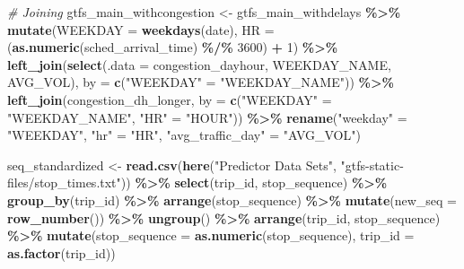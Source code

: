 \documentclass[
  12pt,
]{article}
\newenvironment{Shaded}{\begin{snugshade}}{\end{snugshade}}
\newcommand{\AttributeTok}[1]{\textcolor[rgb]{0.13,0.29,0.53}{#1}}
\newcommand{\CommentTok}[1]{\textcolor[rgb]{0.56,0.35,0.01}{\textit{#1}}}
\newcommand{\DecValTok}[1]{\textcolor[rgb]{0.00,0.00,0.81}{#1}}
\newcommand{\FunctionTok}[1]{\textcolor[rgb]{0.13,0.29,0.53}{\textbf{#1}}}
\newcommand{\NormalTok}[1]{#1}
\newcommand{\OtherTok}[1]{\textcolor[rgb]{0.56,0.35,0.01}{#1}}
\newcommand{\SpecialCharTok}[1]{\textcolor[rgb]{0.81,0.36,0.00}{\textbf{#1}}}
\newcommand{\StringTok}[1]{\textcolor[rgb]{0.31,0.60,0.02}{#1}}
\begin{document}
\begin{Shaded}
\begin{Highlighting}[]
\CommentTok{\# Joining}
\NormalTok{gtfs\_main\_withcongestion }\OtherTok{\textless{}{-}}\NormalTok{ gtfs\_main\_withdelays }\SpecialCharTok{\%\textgreater{}\%}
  \FunctionTok{mutate}\NormalTok{(}\AttributeTok{WEEKDAY =} \FunctionTok{weekdays}\NormalTok{(date),}
         \AttributeTok{HR =}\NormalTok{ (}\FunctionTok{as.numeric}\NormalTok{(sched\_arrival\_time) }\SpecialCharTok{\%/\%} \DecValTok{3600}\NormalTok{) }\SpecialCharTok{+} \DecValTok{1}\NormalTok{) }\SpecialCharTok{\%\textgreater{}\%}
  \FunctionTok{left\_join}\NormalTok{(}\FunctionTok{select}\NormalTok{(}\AttributeTok{.data =}\NormalTok{ congestion\_dayhour, WEEKDAY\_NAME, AVG\_VOL), }
            \AttributeTok{by =} \FunctionTok{c}\NormalTok{(}\StringTok{"WEEKDAY"} \OtherTok{=} \StringTok{"WEEKDAY\_NAME"}\NormalTok{)) }\SpecialCharTok{\%\textgreater{}\%}
  \FunctionTok{left\_join}\NormalTok{(congestion\_dh\_longer,}
            \AttributeTok{by =} \FunctionTok{c}\NormalTok{(}\StringTok{"WEEKDAY"} \OtherTok{=} \StringTok{"WEEKDAY\_NAME"}\NormalTok{,}
                   \StringTok{"HR"} \OtherTok{=} \StringTok{"HOUR"}\NormalTok{)) }\SpecialCharTok{\%\textgreater{}\%}
    \FunctionTok{rename}\NormalTok{(}\StringTok{"weekday"} \OtherTok{=} \StringTok{"WEEKDAY"}\NormalTok{,}
         \StringTok{"hr"} \OtherTok{=} \StringTok{"HR"}\NormalTok{,}
         \StringTok{"avg\_traffic\_day"} \OtherTok{=} \StringTok{"AVG\_VOL"}\NormalTok{)}

\NormalTok{seq\_standardized }\OtherTok{\textless{}{-}} \FunctionTok{read.csv}\NormalTok{(}\FunctionTok{here}\NormalTok{(}\StringTok{"Predictor Data Sets"}\NormalTok{,}
                                  \StringTok{"gtfs{-}static{-}files/stop\_times.txt"}\NormalTok{)) }\SpecialCharTok{\%\textgreater{}\%}
  \FunctionTok{select}\NormalTok{(trip\_id, stop\_sequence) }\SpecialCharTok{\%\textgreater{}\%}
  \FunctionTok{group\_by}\NormalTok{(trip\_id) }\SpecialCharTok{\%\textgreater{}\%}
  \FunctionTok{arrange}\NormalTok{(stop\_sequence) }\SpecialCharTok{\%\textgreater{}\%}
  \FunctionTok{mutate}\NormalTok{(}\AttributeTok{new\_seq =} \FunctionTok{row\_number}\NormalTok{()) }\SpecialCharTok{\%\textgreater{}\%}
  \FunctionTok{ungroup}\NormalTok{() }\SpecialCharTok{\%\textgreater{}\%}
  \FunctionTok{arrange}\NormalTok{(trip\_id, stop\_sequence) }\SpecialCharTok{\%\textgreater{}\%}
  \FunctionTok{mutate}\NormalTok{(}\AttributeTok{stop\_sequence =} \FunctionTok{as.numeric}\NormalTok{(stop\_sequence),}
         \AttributeTok{trip\_id =} \FunctionTok{as.factor}\NormalTok{(trip\_id))}


\end{Highlighting}
\end{Shaded}
\end{document}
